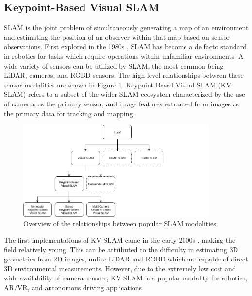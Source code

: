 \subsection{Keypoint-Based Visual SLAM}
\label{sec:kv_slam_background}

SLAM is the joint problem of simultaneously generating a map of an environment and estimating the position of an observer within that map based on sensor observations. First explored in the 1980s \cite{smithEstimatingUncertainSpatial1988}, SLAM has become a de facto standard in robotics for tasks which require operations within unfamiliar environments. A wide variety of sensors can be utilized by SLAM, the most common being LiDAR, cameras, and RGBD sensors. The high level relationships between these sensor modalities are shown in Figure \ref{fig:slam_family_tree}. Keypoint-Based Visual SLAM (KV-SLAM) refers to a subset of the wider SLAM ecosystem characterized by the use of cameras as the primary sensor, and image features extracted from images as the primary data for tracking and mapping.

\begin{figure}[!ht]
    \centering
    \includegraphics[width=0.9\textwidth]{resources/slam_family_tree.png}
    \caption[SLAM Family Tree]{Overview of the relationships between popular SLAM modalities.}
    \label{fig:slam_family_tree}
\end{figure}

The first implementations of KV-SLAM came in the early 2000s \cite{seMobileRobotLocalization2002}\cite{davisonRealtimeSimultaneousLocalisation2003}, making the field relatively young. This can be attributed to the difficulty in estimating 3D geometries from 2D images, unlike LiDAR and RGBD which are capable of direct 3D environmental measurements. However, due to the extremely low cost and wide availability of camera sensors, KV-SLAM is a popular modality for robotics, AR/VR, and autonomous driving applications.

